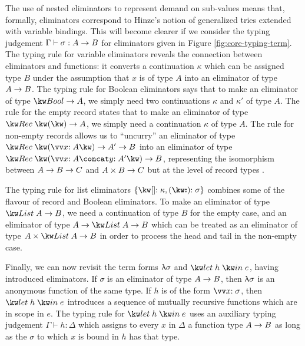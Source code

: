 The use of nested eliminators to represent demand on sub-values means that, formally, eliminators correspond to Hinze's notion of generalized tries \cite{hinze00} extended with variable bindings. This will become clearer if we consider the typing judgement $\Gamma \vdash \sigma: {A}\rightarrow{B}$ for eliminators given in Figure \ref{fig:core-typing-term}. The typing rule for variable eliminators reveals the connection between eliminators and functions: it converts a continuation $\kappa$ which can be assigned type $B$ under the assumption that $x$ is of type $A$ into an eliminator of type ${A}\rightarrow{B}$. The typing rule for Boolean eliminators says that to make an eliminator of type $\tyFun{\tyBool}{A}$, we simply need two continuations $\kappa$ and $\kappa'$ of type $A$. The rule for the empty record states that to make an eliminator of type $\tyFun{\tyRec{}}{A}$, we simply need a continuation $\kappa$ of type $A$. The rule for non-empty records allows us to ``uncurry'' an eliminator of type $\tyFun{\tyRec{\vec{\bind{x}{A}}}}{\tyFun{A'}{B}}$ into an eliminator of type $\tyFun{\tyRec{\vec{\bind{x}{A}} \concat \bind{y}{A'}}}{B}$, representing the isomorphism between ${{A}\rightarrow{B}}\rightarrow{C}$ and ${{A}\times{B}}\rightarrow{C}$ but at the level of record types \cite{hinze00}. 

The typing rule for list eliminators $\elimList{\kappa}{\sigma}$ combines some of the flavour of record and Boolean eliminators. To make an eliminator of type $\tyFun{\tyList{A}}{B}$, we need a continuation of type $B$ for the empty case, and an eliminator of type $\tyFun{A}{\tyFun{\tyList{A}}{B}}$ which can be treated as an eliminator of type $\tyFun{\tyProd{A}{\tyList{A}}}{B}$ in order to process the head and tail in the non-empty case.

Finally, we can now revisit the term forms $\uplambda{\sigma}$ and $\exLetRecMutual{h}{e}$, having introduced eliminators. If $\sigma$ is an eliminator of type ${A}\rightarrow{B}$, then $\uplambda{\sigma}$ is an anonymous function of the same type. If $h$ is of the form $\vec{\bind{x}{\sigma}}$, then $\exLetRecMutual{h}{e}$ introduces a sequence of mutually recursive functions which are in scope in $e$. The typing rule for $\exLetRecMutual{h}{e}$ uses an auxiliary typing judgement $\Gamma \vdash h : \Delta$ which assigns to every $x$ in $\Delta$ a function type ${A}\rightarrow{B}$ as long as the $\sigma$ to which $x$ is bound in $h$ has that type.



